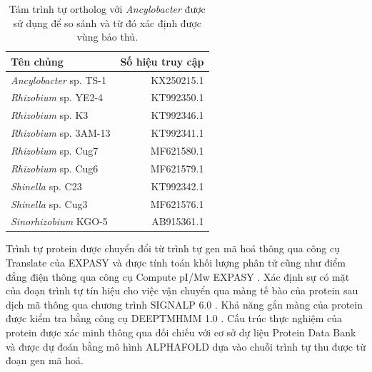 \documentclass[journal]{IEEEtran}
\begin{document}
	\begin{table}[h]
		\centering
		\caption{Tám trình tự ortholog với \textit{Ancylobacter} được sử dụng để so sánh và từ đó xác định được vùng bảo thủ.} \label{table_2}
		\noindent
		\begin{tabularx}{0.49\textwidth}{Xr}
			\hline
			\textbf{Tên chủng} & \textbf{Số hiệu truy cập} \\ \hline
			
			\textit{Ancylobacter} sp. TS-1          & KX250215.1                                  \\
			
			\textit{Rhizobium} sp. YE2-4            & KT992350.1                                  \\
			
			\textit{Rhizobium} sp. K3               & KT992346.1                                  \\
			
			\textit{Rhizobium} sp. 3AM-13           & KT992341.1                                  \\
			
			\textit{Rhizobium} sp. Cug7             & MF621580.1                                  \\
			
			\textit{Rhizobium} sp. Cug6             & MF621579.1                                  \\
			
			\textit{Shinella} sp. C23               & KT992342.1                                  \\
			
			\textit{Shinella} sp. Cug3              & MF621576.1                                  \\
			
			\textit{Sinorhizobium} KGO-5            & AB915361.1                                   \\ \hline
			
		\end{tabularx}
	\end{table}
	
	Trình tự protein được chuyển đổi từ trình tự gen mã hoá thông qua công cụ Translate của {\footnotesize EXPASY} \cite{gasteiger2003expasy} và được tính toán khối lượng phân tử cũng như điểm đẳng điện thông qua công cụ Compute pI/Mw {\footnotesize EXPASY} \cite{bjellqvist1993focusing,bjellqvist1994reference,gasteiger2005protein}. Xác định sự có mặt của đoạn trình tự tín hiệu cho việc vận chuyển qua màng tế bào của protein sau dịch mã thông qua chương trình {\footnotesize SIGNALP 6.0} \cite{teufel2022signalp}. Khả năng gắn màng của protein được kiểm tra bằng công cụ {\footnotesize DEEPTMHMM 1.0} \cite{hallgren2022deeptmhmm}. Cấu trúc thực nghiệm của protein được xác minh thông qua đối chiếu với cơ sở dự liệu Protein Data Bank \cite{berman2000protein} và được dự đoán bằng mô hình {\footnotesize ALPHAFOLD} \cite{jumper2021highly} dựa vào chuỗi trình tự thu được từ đoạn gen mã hoá.
	
\end{document}
